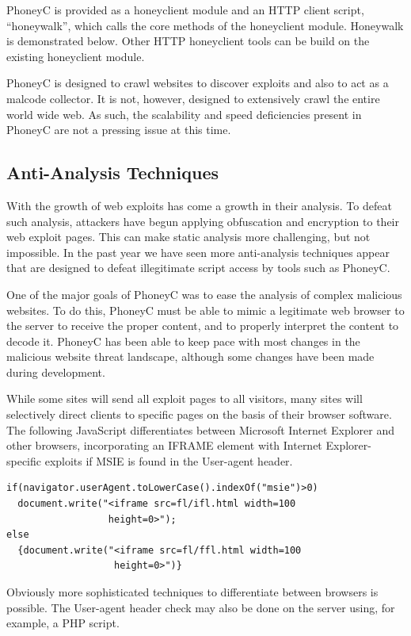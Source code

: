\documentclass[10pt,twocolumn]{article}
\begin{document}
PhoneyC is provided as a honeyclient module and an HTTP client script, ``honeywalk'', which calls the core methods of the honeyclient module. Honeywalk is demonstrated below. Other HTTP honeyclient tools can be build on the existing honeyclient module. 

PhoneyC is designed to crawl websites to discover exploits and also to act as a malcode collector. It is not, however, designed to extensively crawl the entire world wide web. As such, the scalability and speed deficiencies present in PhoneyC are not a pressing issue at this time. 

\subsection{Anti-Analysis Techniques}
\label{anti-analysis}

With the growth of web exploits has come a growth in their analysis. To defeat such analysis, attackers have begun applying obfuscation and encryption to their web exploit pages. This can make static analysis more challenging, but not impossible. In the past year we have seen more anti-analysis techniques appear that are designed to defeat illegitimate script access by tools such as PhoneyC. 

One of the major goals of PhoneyC was to ease the analysis of complex malicious websites. To do this, PhoneyC must be able to mimic a legitimate web browser to the server to receive the proper content, and to properly interpret the content to decode it. PhoneyC has been able to keep pace with most changes in the malicious website threat landscape, although some changes have been made during development. 

While some sites will send all exploit pages to all visitors, many sites will selectively direct clients to specific pages on the basis of their browser software. The following JavaScript differentiates between Microsoft Internet Explorer and other browsers, incorporating an IFRAME element with Internet Explorer-specific exploits if MSIE is found in the User-agent header. 
\scriptsize
\begin{verbatim}
if(navigator.userAgent.toLowerCase().indexOf("msie")>0)
  document.write("<iframe src=fl/ifl.html width=100 
                  height=0>");
else
  {document.write("<iframe src=fl/ffl.html width=100 
                   height=0>")}
\end{verbatim}
\normalsize
Obviously more sophisticated techniques to differentiate between browsers is possible. The User-agent header check may also be done on the server using, for example, a PHP script. 
\end{document}
